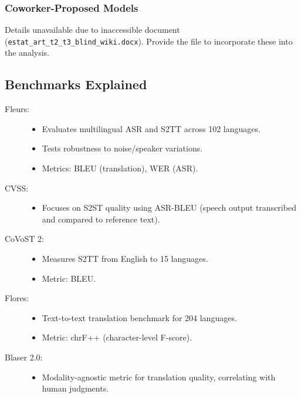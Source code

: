 \subsubsection{Coworker-Proposed Models}
Details unavailable due to inaccessible document (\texttt{estat\_art\_t2\_t3\_blind\_wiki.docx}). Provide the file to incorporate these into the analysis.

\subsection{Benchmarks Explained}

\begin{description}
    \item[Fleurs:] 
    \begin{itemize}
        \item Evaluates multilingual ASR and S2TT across 102 languages.
        \item Tests robustness to noise/speaker variations.
        \item Metrics: BLEU (translation), WER (ASR).
    \end{itemize}
    
    \item[CVSS:] 
    \begin{itemize}
        \item Focuses on S2ST quality using ASR-BLEU (speech output transcribed and compared to reference text).
    \end{itemize}
    
    \item[CoVoST 2:] 
    \begin{itemize}
        \item Measures S2TT from English to 15 languages.
        \item Metric: BLEU.
    \end{itemize}
    
    \item[Flores:] 
    \begin{itemize}
        \item Text-to-text translation benchmark for 204 languages.
        \item Metric: chrF++ (character-level F-score).
    \end{itemize}
    
    \item[Blaser 2.0:] 
    \begin{itemize}
        \item Modality-agnostic metric for translation quality, correlating with human judgments.
    \end{itemize}
\end{description}

